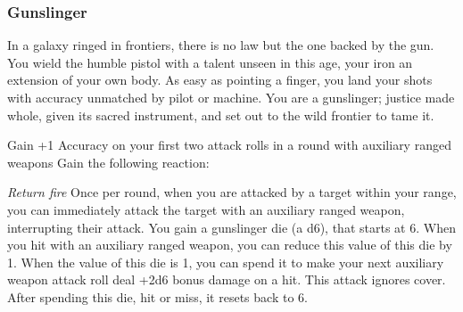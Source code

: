 \subsubsection{Gunslinger}

\begin{talent}
{In a galaxy ringed in frontiers, there is no law but the one backed by the gun. You wield the humble pistol with a talent unseen in this age, your iron an extension of your own body. As easy as pointing a finger, you land your shots with accuracy unmatched by pilot or machine. You are a gunslinger; justice made whole, given its sacred instrument, and set out to the wild frontier to tame it.}

Gain +1 Accuracy on your first two attack rolls in a round with auxiliary ranged weapons
Gain the following reaction:

\textit{Return fire}\newline
\Reaction\newline
Once per round, when you are attacked by a target within your range, you can immediately attack the target with an auxiliary ranged weapon, interrupting their attack. 
You gain a gunslinger die (a d6), that starts at 6. When you hit with an auxiliary ranged weapon, you can reduce this value of this die by 1. When the value of this die is 1, you can spend it to make your next auxiliary weapon attack roll deal +2d6 bonus damage on a hit. This attack ignores cover. After spending this die, hit or miss, it resets back to 6.
\end{talent}